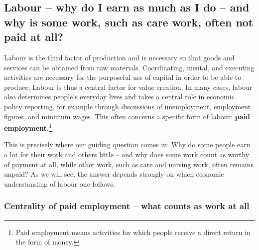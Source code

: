 \documentclass[
  british,
  a4paper,
  DIV=11,
  numbers=noendperiod,
  oneside,
  openany]{scrreprt}
\begin{document}
\subsection{Labour -- why do I earn as much as I do -- and why is some
work, such as care work, often not paid at
all?}\label{labour-why-do-i-earn-as-much-as-i-do-and-why-is-some-work-such-as-care-work-often-not-paid-at-all}

Labour is the third factor of production and is necessary so that goods
and services can be obtained from raw materials. Coordinating, mental,
and executing activities are necessary for the purposeful use of capital
in order to be able to produce. Labour is thus a central factor for
value creation. In many cases, labour also determines people's everyday
lives and takes a central role in economic policy reporting, for example
through discussions of unemployment, employment figures, and minimum
wages. This often concerns a specific form of labour: \textbf{paid
employment.}\footnote{Paid employment means activities for which people
  receive a direct return in the form of money.}

This is precisely where our guiding question comes in: Why do some
people earn a lot for their work and others little -- and why does some
work count as worthy of payment at all, while other work, such as care
and nursing work, often remains unpaid? As we will see, the answer
depends strongly on which economic understanding of labour one follows.

\subsubsection{Centrality of paid employment -- what counts as work at
all}\label{centrality-of-paid-employment-what-counts-as-work-at-all}
\end{document}
